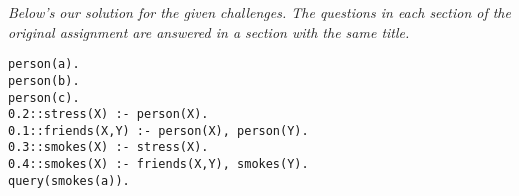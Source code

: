 \documentclass{res/theme}
\subtitle{Michiel Janssen \& Bruno Vandekerkhove}
\begin{document}
\maketitle
\tableofcontents

\vspace{0.5cm}
\begin{center}
\end{center}

%
%
\begin{center}
\textit{Below's our solution for the given challenges. The questions in each section of the original assignment are answered in a section with the same title.}
\end{center}

\vspace{0.2cm}
\begin{code}
\begin{verbatim}
person(a). 
person(b). 
person(c). 
0.2::stress(X) :- person(X). 
0.1::friends(X,Y) :- person(X), person(Y). 
0.3::smokes(X) :- stress(X). 
0.4::smokes(X) :- friends(X,Y), smokes(Y). 
query(smokes(a)).
\end{verbatim}
\label{code:base}
\end{code}

%
% 


%
% 


%
% 


% 
%
%
%

%
%

%
\end{document}
